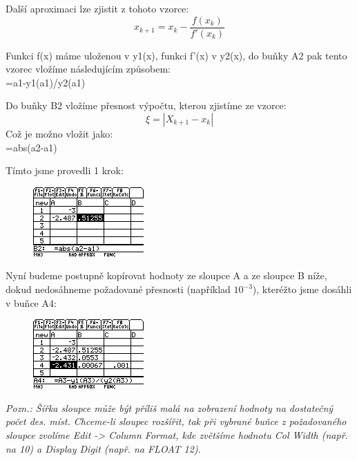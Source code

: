 \documentclass[10pt,a4paper,float]{article}
\begin{document}
Další aproximaci lze zjistit z tohoto vzorce:
\[
	x_{k+1} = x_k - \frac{f(x_k)}{f'(x_k)}
\]

Funkci f(x) máme uloženou v y1(x), funkci f'(x) v y2(x), do buňky A2 pak tento vzorec vložíme následujícím způsobem:\\
=a1-y1(a1)/y2(a1)

Do buňky B2 vložíme přesnost výpočtu, kterou zjistíme ze vzorce:
\[
	\xi = |X_{k+1} - x_k|
\]
Což je možno vložit jako:\\
=abs(a2-a1)

Tímto jsme provedli 1 krok:

\begin{figure}[H]
	\centering
	\includegraphics[width=.5\textwidth]{img/1NEWTON6.PNG}
\end{figure}

Nyní budeme postupně kopírovat hodnoty ze sloupce A a ze sloupce B níže, dokud nedosáhneme požadované přesnosti (například $10^{-3}$), kteréžto jsme dosáhli v buňce A4:


\begin{figure}[H]
	\centering
	\includegraphics[width=.5\textwidth]{img/1NEWTON7.PNG}
\end{figure}

\textit{Pozn.: Šířka sloupce může být příliš malá na zobrazení hodnoty na dostatečný počet des. míst. Chceme-li sloupec rozšířit, tak při vybrané buňce z požadovaného sloupce zvolíme Edit -> Column Format, kde zvětšíme hodnotu Col Width (např. na 10) a Display Digit (např. na FLOAT 12)}.
\end{document}
